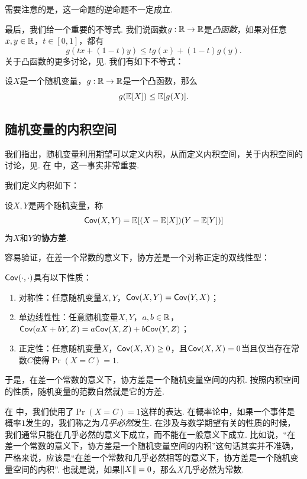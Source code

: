 需要注意的是，这一命题的逆命题不一定成立. 

最后，我们给一个重要的不等式. 我们说函数$g:\mathbb{R}\to\mathbb{R}$是\textit{凸函数}，如果对任意$x,y\in\mathbb{R}$，$t\in[0,1]$，都有
\[g(tx+(1-t)y)\leq tg(x)+(1-t)g(y).\]
关于凸函数的更多讨论，见. 我们有如下不等式：

\begin{theorem}[Jensen不等式]\label{theorem:jensen}
设$X$是一个随机变量，$g:\mathbb{R}\to\mathbb{R}$是一个凸函数，那么
\[g(\mathbb{E}[X])\leq \mathbb{E}[g(X)].\]
\end{theorem}

\subsection{随机变量的内积空间}\label{subsec:inner-product}

我们指出，随机变量利用期望可以定义内积，从而定义内积空间，关于内积空间的讨论，见. 在 中，这一事实非常重要. 

我们定义内积如下：

\begin{definition}[协方差] 
设$X,Y$是两个随机变量，称
\[\mathsf{Cov}(X,Y)=\mathbb{E}[(X-\mathbb{E}[X])(Y-\mathbb{E}[Y])]\]
为$X$和$Y$的\textbf{协方差}. 
\end{definition}

容易验证，在差一个常数的意义下，协方差是一个对称正定的双线性型：

\begin{proposition}\label{proposition:covariance-inner-product}
$\mathsf{Cov}(\cdot,\cdot)$具有以下性质：
\begin{enumerate}
    \item 对称性：任意随机变量$X,Y$，$\mathsf{Cov}(X,Y)=\mathsf{Cov}(Y,X)$；
    \item 单边线性性：任意随机变量$X,Y$，$a,b\in\mathbb{R}$，$\mathsf{Cov}(aX+bY,Z)=a\mathsf{Cov}(X,Z)+b\mathsf{Cov}(Y,Z)$；
    \item 正定性：任意随机变量$X$，$\mathsf{Cov}(X,X)\geq 0$，且$\mathsf{Cov}(X,X)=0$当且仅当存在常数$C$使得$\Pr(X=C)=1$.
\end{enumerate}
\end{proposition}

于是，在差一个常数的意义下，协方差是一个随机变量空间的内积. 按照内积空间的性质，随机变量的范数自然就是它的方差. 

\begin{remark}
    在 中，我们使用了$\Pr(X=C)=1$这样的表达. 在概率论中，如果一个事件是概率$1$发生的，我们称之为\textit{几乎必然}发生. 在涉及与数学期望有关的性质的时候，我们通常只能在几乎必然的意义下成立，而不能在一般意义下成立. 比如说，“在差一个常数的意义下，协方差是一个随机变量空间的内积”这句话其实并不准确，严格来说，应该是“在差一个常数和几乎必然相等的意义下，协方差是一个随机变量空间的内积”. 也就是说，如果$\left\|X\right\|=0$，那么$X$几乎必然为常数.
\end{remark}

